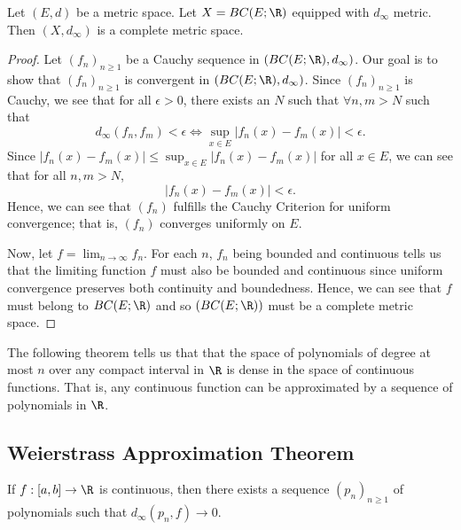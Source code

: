 \begin{theorem}[Rudin 7.15]
    Let \( (E,d) \) be a metric space. Let \( X = BC(E;\R) \) equipped with \( {d}_{\infty } \) metric. Then \( (X, {d}_{\infty }) \) is a complete metric space. 
\end{theorem}
\begin{proof}
    Let \( ({f}_{n})_{n \geq 1}   \) be a Cauchy sequence in \( (BC(E;\R), {d}_{\infty }) \). Our goal is to show that \( ({f}_{n})_{n \geq 1} \) is convergent in \( (BC(E;\R), {d}_{\infty}) \). Since \( ({f}_{n})_{n \geq 1} \) is Cauchy, we see that for all \( \epsilon > 0  \), there exists an \( N  \) such that \( \forall n,m > N  \) such that 
    \[  {d}_{\infty } ({f}_{n}, {f}_{m}) < \epsilon \iff \sup_{x \in E } | {f}_{n}(x) - {f}_{m}(x) |  < \epsilon. \]
    Since \( | {f}_{n}(x) - {f}_{m}(x) |  \leq \sup_{x \in E } | {f}_{n}(x) - {f}_{m}(x) |   \) for all \( x \in E  \), we can see that for all \( n,m > N  \), \[  | {f}_{n}(x) - {f}_{m}(x)  |  < \epsilon. \] 
    Hence, we can see that \( ({f}_{n}) \) fulfills the Cauchy Criterion for uniform convergence; that is, \( ({f}_{n}) \) converges uniformly on \( E  \).

    Now, let \( f = \lim_{ n \to \infty  }  {f}_{n} \). For each \( n  \), \( {f}_{n} \) being bounded and continuous tells us that the limiting function \( f  \) must also be bounded and continuous since uniform convergence preserves both continuity and boundedness. Hence, we can see that \( f  \) must belong to \( BC(E; \R) \) and so \( (BC(E;\R)) \) must be a complete metric space.
\end{proof}

The following theorem tells us that that the space of polynomials of degree at most \( n \) over any compact interval in \( \R  \) is dense in the space of continuous functions. That is, any continuous function can be approximated by a sequence of polynomials in \( \R  \).

\subsection{Weierstrass Approximation Theorem}

\begin{theorem}[Rudin 7.26]\label{Rudin 7.26}
    If \( f: [a,b] \to \R  \) is continuous, then there exists a sequence \(({p}_{n})_{n \geq 1} \) of polynomials such that \( {d}_{\infty }({p}_{n}, f) \to 0  \).
\end{theorem}

